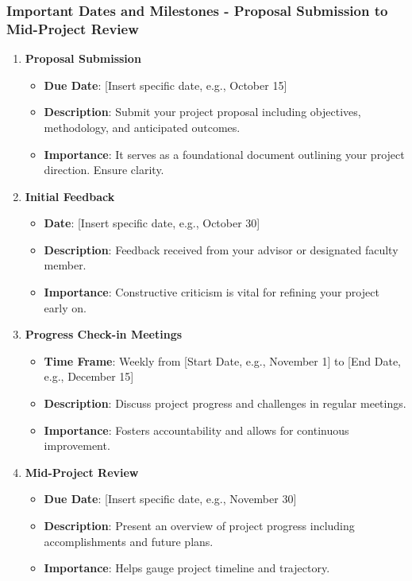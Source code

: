\documentclass{beamer}
\begin{document}
\begin{frame}[fragile]
    \frametitle{Important Dates and Milestones - Proposal Submission to Mid-Project Review}
    \begin{enumerate}
        \item \textbf{Proposal Submission}
        \begin{itemize}
            \item \textbf{Due Date}: [Insert specific date, e.g., October 15]
            \item \textbf{Description}: Submit your project proposal including objectives, methodology, and anticipated outcomes.
            \item \textbf{Importance}: It serves as a foundational document outlining your project direction. Ensure clarity.
        \end{itemize}
        
        \item \textbf{Initial Feedback}
        \begin{itemize}
            \item \textbf{Date}: [Insert specific date, e.g., October 30]
            \item \textbf{Description}: Feedback received from your advisor or designated faculty member.
            \item \textbf{Importance}: Constructive criticism is vital for refining your project early on.
        \end{itemize}
        
        \item \textbf{Progress Check-in Meetings}
        \begin{itemize}
            \item \textbf{Time Frame}: Weekly from [Start Date, e.g., November 1] to [End Date, e.g., December 15]
            \item \textbf{Description}: Discuss project progress and challenges in regular meetings.
            \item \textbf{Importance}: Fosters accountability and allows for continuous improvement.
        \end{itemize}

        \item \textbf{Mid-Project Review}
        \begin{itemize}
            \item \textbf{Due Date}: [Insert specific date, e.g., November 30]
            \item \textbf{Description}: Present an overview of project progress including accomplishments and future plans.
            \item \textbf{Importance}: Helps gauge project timeline and trajectory.
        \end{itemize}
    \end{enumerate}
\end{frame}
\end{document}

